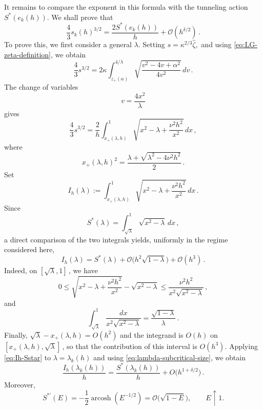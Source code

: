 \documentclass[11pt]{amsart}
\numberwithin{equation}{section}
\theoremstyle{remark}
\begin{document}
It remains to compare the exponent in this formula with the
tunneling action $S^*(e_k(h))$. We shall prove that
\begin{equation}\label{eq:Airy-action-identification-goal}
	\frac43s_k(h)^{3/2}
	=
	\frac{2S^*(e_k(h))}{h}
	+\mathcal O(h^{\delta/2})\,.
\end{equation}
To prove this, we first consider a general $\lambda$. Setting
$
s=\kappa^{2/3}\widehat\zeta,
$
and using \eqref{eq:LG-zeta-definition}, we obtain
\begin{equation}\label{eq:Airy-exponent-LG}
	\frac43s^{3/2}
	=
	2\kappa
	\int_{z_+(\alpha)}^{4/\lambda}
	\sqrt{\frac{v^2-4v+\alpha^2}{4v^2}}\,dv\,.
\end{equation}
The change of variables
\[
v=\frac{4x^2}{\lambda}
\]
gives
\begin{equation}\label{eq:LG-action-x}
	\frac43s^{3/2}
	=
	\frac{2}{h}
	\int_{x_+(\lambda,h)}^1
	\sqrt{x^2-\lambda+\frac{\nu^2h^2}{x^2}}\,dx\,,
\end{equation}
where
\begin{equation}\label{eq:x-plus-subcritical}
	x_+(\lambda,h)^2
	=
	\frac{\lambda+\sqrt{\lambda^2-4\nu^2h^2}}{2}\,.
\end{equation}
Set
\[
I_h(\lambda)
:=
\int_{x_+(\lambda,h)}^1
\sqrt{x^2-\lambda+\frac{\nu^2h^2}{x^2}}\,dx\,.
\]
Since
\[
S^*(\lambda)
=
\int_{\sqrt{\lambda}}^1\sqrt{x^2-\lambda}\,dx\,,
\]
a direct comparison of the two integrals yields, uniformly in the
regime considered here,
\begin{equation}\label{eq:Ih-Sstar}
	I_h(\lambda)
	=
	S^*(\lambda)
	+
	\mathcal O\bigl(h^2\sqrt{1-\lambda}\bigr)
	+
	\mathcal O(h^3)\,.
\end{equation}
Indeed, on $[\sqrt{\lambda},1]\,$, we have
\[
0\leq
\sqrt{x^2-\lambda+\frac{\nu^2h^2}{x^2}}
-\sqrt{x^2-\lambda}
\leq
\frac{\nu^2h^2}{x^2\sqrt{x^2-\lambda}}\,,
\]
and
\[
\int_{\sqrt{\lambda}}^1
\frac{dx}{x^2\sqrt{x^2-\lambda}}
=
\frac{\sqrt{1-\lambda}}{\lambda}\,.
\]
Finally,
$\sqrt{\lambda}-x_+(\lambda,h)=O(h^2)$ and the integrand is $O(h)$
on $[x_+(\lambda,h),\sqrt{\lambda}]\,$, so that the contribution of this
interval is $O(h^3)$. Applying \eqref{eq:Ih-Sstar} to $\lambda=\lambda_k(h)$ and using
\eqref{eq:lambda-subcritical-size}, we obtain
\begin{equation}\label{eq:Ih-Sstar-lambdak}
	\frac{I_h(\lambda_k(h))}{h}
	=
	\frac{S^*(\lambda_k(h))}{h}
	+
	O\bigl(h^{1+\delta/2}\bigr)\,.
\end{equation}
Moreover,
\[
S^{*\prime}(E)
=
-\frac12\operatorname{arcosh}(E^{-1/2})
=
\mathcal O\bigl(\sqrt{1-E}\bigr),
\qquad E\uparrow1.
\]
\end{document}
